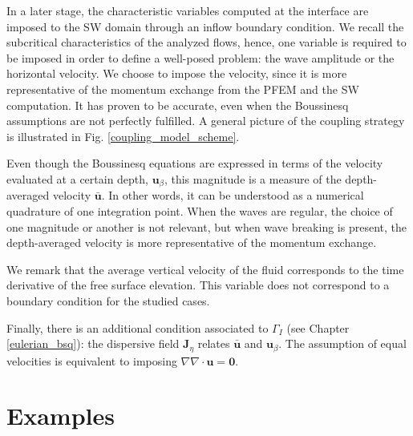 In a later stage, the characteristic variables computed at the interface are imposed to the SW domain through an inflow boundary condition. We recall the subcritical characteristics of the analyzed flows, hence, one variable is required to be imposed in order to define a well-posed problem: the wave amplitude or the horizontal velocity. 
We choose to impose the velocity, since it is more representative of the momentum exchange from the PFEM and the SW computation. It has proven to be accurate, even when the Boussinesq assumptions are not perfectly fulfilled.
A general picture of the coupling strategy is illustrated in Fig. \ref{coupling_model_scheme}.

Even though the Boussinesq equations are expressed in terms of the velocity evaluated at a certain depth, $\mathbf{u}_\beta$, this magnitude is a measure of the depth-averaged velocity $\bar{\mathbf{u}}$. In other words, it can be understood as a numerical quadrature of one integration point. When the waves are regular, the choice of one magnitude or another is not relevant, but when wave breaking is present, the depth-averaged velocity is more representative of the momentum exchange.

We remark that the average vertical velocity of the fluid corresponds to the time derivative of the free surface elevation. This variable does not correspond to a boundary condition for the studied cases.

Finally, there is an additional condition associated to $\Gamma_I$ (see Chapter \ref{eulerian_bsq}): the dispersive field $\mathbf{J}_\eta$ relates $\bar{\mathbf{u}}$ and $\mathbf{u}_\beta$. The assumption of equal velocities is equivalent to imposing $\nabla\nabla\cdot\mathbf{u}=\mathbf{0}$.



\section{Examples}




